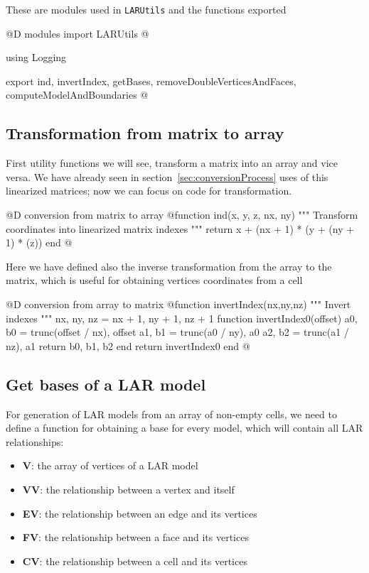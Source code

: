 \documentclass[11pt,oneside]{article}	%
\begin{document}
These are modules used in \texttt{LARUtils} and the functions exported

@D modules import LARUtils
@{using Logging

export ind, invertIndex, getBases, removeDoubleVerticesAndFaces,
    computeModelAndBoundaries
@}

\subsection{Transformation from matrix to array}\label{sec:matrixTransform}

First utility functions we will see, transform a matrix into an array and vice versa. We have already seen in section~\ref{sec:conversionProcess} uses of this linearized matrices; now we can focus on code for transformation.

@D conversion from matrix to array
@{function ind(x, y, z, nx, ny)
    """
    Transform coordinates into linearized matrix indexes
    """
    return x + (nx + 1) * (y + (ny + 1) * (z))
end @}

Here we have defined also the inverse transformation from the array to the matrix, which is useful for obtaining vertices coordinates from a cell

@D conversion from array to matrix
@{function invertIndex(nx,ny,nz)
  """
  Invert indexes
  """
  nx, ny, nz = nx + 1, ny + 1, nz + 1
  function invertIndex0(offset)
      a0, b0 = trunc(offset / nx), offset %
      a1, b1 = trunc(a0 / ny), a0 %
      a2, b2 = trunc(a1 / nz), a1 %
      return b0, b1, b2
  end
  return invertIndex0
end @}

\subsection{Get bases of a LAR model}\label{sec:getBases}

For generation of LAR models from an array of non-empty cells, we need to define a function for obtaining a base for every model, which will contain all LAR relationships:
\begin{itemize}
 \item \textbf{V}: the array of vertices of a LAR model
 \item \textbf{VV}: the relationship between a vertex and itself
 \item \textbf{EV}: the relationship between an edge and its vertices
 \item \textbf{FV}: the relationship between a face and its vertices
 \item \textbf{CV}: the relationship between a cell and its vertices
\end{itemize}
\end{document}
